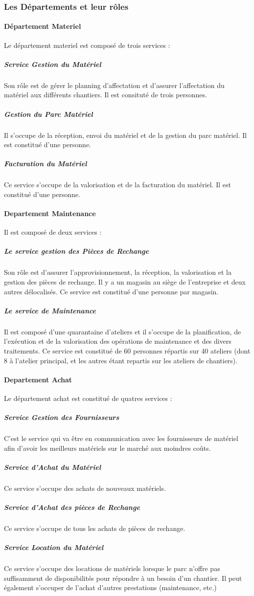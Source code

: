         \subsubsection{Les Départements et leur rôles}
            \paragraph{Département Materiel}
                Le département materiel est composé de trois services :
                \subparagraph{Service Gestion du Matériel}
                    Son rôle est de gérer le planning d’affectation et d’assurer l’affectation du matériel aux différents chantiers. Il est consituté de trois personnes.
                \subparagraph{Gestion du Parc Matériel}
                    Il s’occupe de la réception, envoi du matériel et de la gestion du parc matériel. Il est constitué d'une personne.
                \subparagraph{Facturation du Matériel}
                    Ce service s’occupe de la valorisation et de la facturation du matériel. Il est constitué d'une personne.        
                
            \paragraph{Departement Maintenance}
                Il est composé de deux services :
                \subparagraph{Le service gestion des Pièces de Rechange}
                    Son rôle est d’assurer l’approvisionnement, la réception, la valorisation et la gestion des pièces   de rechange. Il y a un magasin au siège de l’entreprise et deux autres délocalisés. Ce service est constitué d'une personne par magasin. 
                \subparagraph{Le service de Maintenance}
                    Il est composé d’une quarantaine d’ateliers et il s’occupe de la planification, de l’exécution et de la valorisation des opérations de maintenance et des divers traitements. Ce service est constitué de 60 personnes répartis sur 40 ateliers (dont 8 à l’atelier principal, et les autres étant repartis sur les ateliers de chantiers).

            \paragraph{Departement Achat}
                Le département achat est constitué de quatres services :

                \subparagraph{Service Gestion des Fournisseurs}
	                C'est le service qui va être en communication avec les fournisseurs de matériel afin d'avoir les meilleurs matériels sur le marché aux moindres coûts.
                \subparagraph{Service d’Achat du Matériel}
	                Ce service s'occupe des achats de nouveaux matériels.
                \subparagraph{Service d’Achat des pièces de Rechange}
	                Ce service s'occupe de tous les achats de pièces de rechange.
                \subparagraph{Service Location du Matériel}
	                Ce service s'occupe des locations de matériels lorsque le parc n'offre pas suffisamment de disponibilités pour répondre à un besoin d'un chantier. Il peut également s’occuper de l’achat d’autres prestations (maintenance, etc.)
